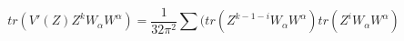 \begin{equation}
tr(V'(Z) Z^k W_\alpha W^\alpha) =\frac{1}{32\pi^2} \sum(tr(Z^{k-1-i}W_\alpha
W^\alpha)tr(Z^iW_\alpha W^\alpha)
\end{equation}

